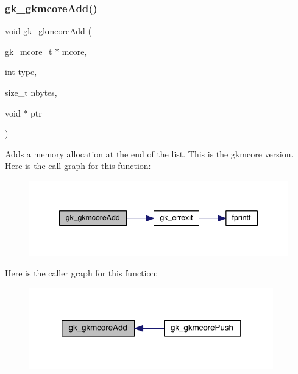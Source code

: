 \subsubsection{\texorpdfstring{gk\+\_\+gkmcore\+Add()}{gk\_gkmcoreAdd()}}
{\footnotesize\ttfamily void gk\+\_\+gkmcore\+Add (\begin{DoxyParamCaption}\item[{\hyperlink{a00682}{gk\+\_\+mcore\+\_\+t} $\ast$}]{mcore,  }\item[{int}]{type,  }\item[{size\+\_\+t}]{nbytes,  }\item[{void $\ast$}]{ptr }\end{DoxyParamCaption})}

Adds a memory allocation at the end of the list. This is the gkmcore version. Here is the call graph for this function\+:\nopagebreak
\begin{figure}[H]
\begin{center}
\leavevmode
\includegraphics[width=344pt]{a00077_a3777d3929aad6ae5e17b76656cd6797b_cgraph}
\end{center}
\end{figure}
Here is the caller graph for this function\+:\nopagebreak
\begin{figure}[H]
\begin{center}
\leavevmode
\includegraphics[width=300pt]{a00077_a3777d3929aad6ae5e17b76656cd6797b_icgraph}
\end{center}
\end{figure}
\mbox{\label{a00077_afe0ba6f8d611bfebcbe80468c86af884}} 
